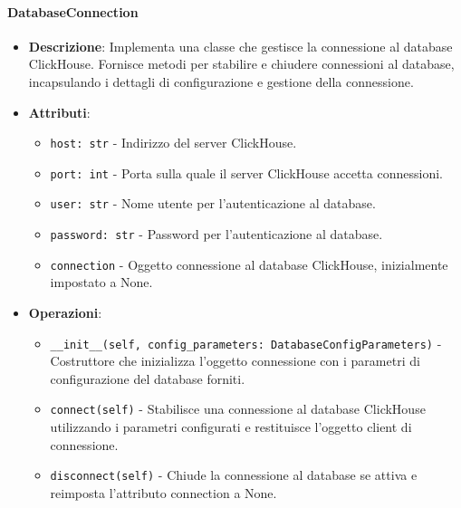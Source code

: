 \documentclass[10pt]{article}
\begin{document}
    \paragraph{DatabaseConnection}
    \begin{itemize} 
    \item \textbf{Descrizione}: Implementa una classe che gestisce la connessione al database ClickHouse. Fornisce metodi per stabilire e chiudere connessioni al database, incapsulando i dettagli di configurazione e gestione della connessione.
    \item \textbf{Attributi}:
    \begin{itemize}
        \item \texttt{host: str} - Indirizzo del server ClickHouse.
        \item \texttt{port: int} - Porta sulla quale il server ClickHouse accetta connessioni.
        \item \texttt{user: str} - Nome utente per l'autenticazione al database.
        \item \texttt{password: str} - Password per l'autenticazione al database.
        \item \texttt{connection} - Oggetto connessione al database ClickHouse, inizialmente impostato a None.
    \end{itemize}
    
    \item \textbf{Operazioni}:
    \begin{itemize}
        \item \texttt{\_\_init\_\_(self, config\_parameters: DatabaseConfigParameters)} - Costruttore che inizializza l'oggetto connessione con i parametri di configurazione del database forniti.
        
        \item \texttt{connect(self)} - Stabilisce una connessione al database ClickHouse utilizzando i parametri configurati e restituisce l'oggetto client di connessione.
        
        \item \texttt{disconnect(self)} - Chiude la connessione al database se attiva e reimposta l'attributo connection a None.
    \end{itemize}
    \end{itemize}
\end{document}
